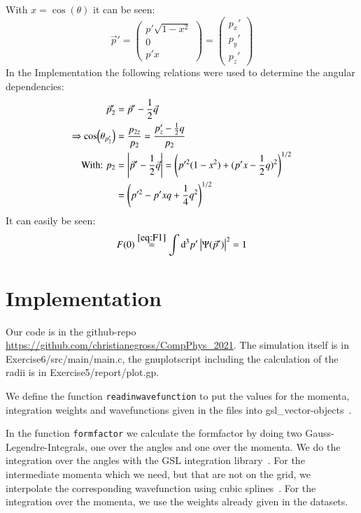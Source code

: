 \documentclass{scrartcl}
\begin{document}
With $x=\cos(\theta)$ it can be seen:
\begin{equation}
	\vec{p}'=\left(\begin{array}{c}
	p'\sqrt{1-x^2}\\
	0\\
	p'x
	\end{array}\right)=\left(\begin{array}{c}
	p_{x}'\\
	p_{y}'\\
	p_{z}'
	\end{array}\right)
\end{equation}
In the Implementation the following relations were used to determine the angular dependencies:
\begin{align}
	\vec{p}_2'&=\vec{p}'-\dfrac{1}{2}\vec{q}\\
	\Rightarrow \cos(\theta_{p_2'})&=\dfrac{p_{2z}}{p_2}=\dfrac{p_{z}'-\frac{1}{2}q}{p_2}\\
	\text{With: } p_2&=\abs{\vec{p}'-\frac{1}{2}\vec{q}}=\left(p'^2(1-x^2)+(p'x-\dfrac{1}{2}q)^2\right)^{1/2}\\
	&=\left(p'^2-p'x q +\dfrac{1}{4}q^2\right)^{1/2}
\end{align}
It can easily be seen:
\begin{equation}
	F(0)\overset{\ref{eq:F1}}{=}\int \dd[3]{p'}\abs{\Psi(\vec{p}')}^2=1
\end{equation}


\section{Implementation}

Our code is in the github-repo \url{https://github.com/christianegross/CompPhys\_2021}. The simulation itself is in Exercise6/src/main/main.c, the gnuplotscript including the calculation of the radii is in Exercise5/report/plot.gp. 

We define the function \texttt{readinwavefunction} to put the values for the momenta, integration weights and wavefunctions given in the files into gsl\_vector-objects~\cite{gsldoc_blk}. 

In the function \texttt{formfactor} we calculate the formfactor by doing two Gauss-Legendre-Integrals, one over the angles and one over the momenta. We do the integration over the angles with the GSL integration library~\cite{gsldoc_integrate}. For the intermediate momenta which we need, but that are not on the grid, we interpolate the corresponding wavefunction using cubic splines~\cite{gsldoc_interpolate}. For the integration over the momenta, we use the weights already given in the datasets.
\end{document}
